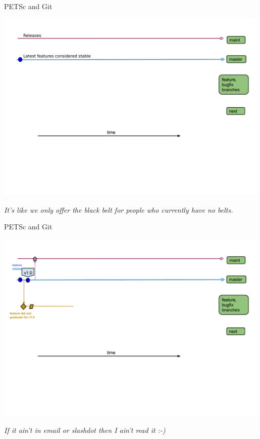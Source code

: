 \begin{frame}{PETSc and Git}
  \begin{center}
    \includegraphics[width=0.99\textwidth]{figures/gitworkflows-50}
  \end{center}
  \begin{flushright} \vspace*{-0.5cm}
   \textit{It's like we only offer the black belt for people who currently have no belts.}
  \end{flushright}
\end{frame}

\begin{frame}{PETSc and Git}
  \begin{center}
    \includegraphics[width=0.99\textwidth]{figures/gitworkflows-55}
  \end{center}
  \begin{flushright} \vspace*{-0.5cm}
   \textit{If it ain't in email or slashdot then I ain't read it :-)}
  \end{flushright}
\end{frame}

